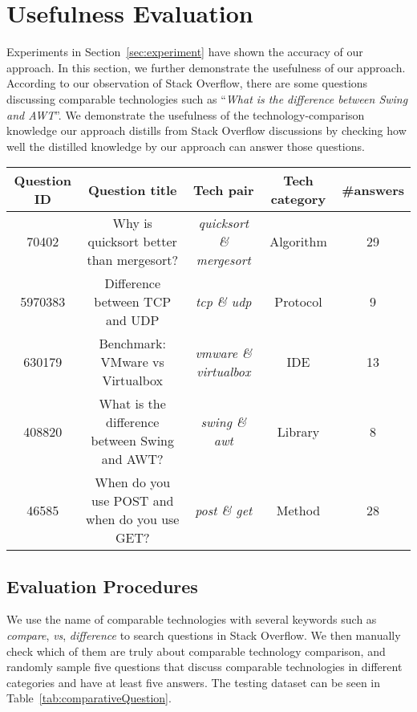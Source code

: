 \section{Usefulness Evaluation}
\label{sec:usefulness}
Experiments in Section~\ref{sec:experiment} have shown the accuracy of our approach.
In this section, we further demonstrate the usefulness of our approach.
According to our observation of Stack Overflow, there are some questions discussing comparable technologies such as ``\textit{What is the difference between Swing and AWT}''.
We demonstrate the usefulness of the technology-comparison knowledge our approach distills from Stack Overflow discussions by checking how well the distilled knowledge by our approach can answer those questions.

\begin{table*}
	\centering
	\caption{Comparative questions}
	\vspace{-3mm}
	\begin{tabular}{c|c|c|c|c}
	\hline
	\textbf{Question ID} & \textbf{Question title} & \textbf{Tech pair} & \textbf{Tech category} & \textbf{\#answers} \\ \hline
	70402 & Why is quicksort better than mergesort? & \textit{quicksort \& mergesort} & Algorithm & 29 \\
	5970383 & Difference between TCP and UDP & \textit{tcp \& udp} & Protocol & 9 \\
	630179 & Benchmark: VMware vs Virtualbox & \textit{vmware \& virtualbox} & IDE & 13 \\
	408820 & What is the difference between Swing and AWT? & \textit{swing \& awt} & Library & 8 \\
	46585 & When do you use POST and when do you use GET? & \textit{post \& get} & Method & 28 \\
	\hline
	\end{tabular}
	\vspace{-1mm}
	\label{tab:comparativeQuestion}
\end{table*}

\subsection{Evaluation Procedures}
We use the name of comparable technologies with several keywords such as \textit{compare}, \textit{vs}, \textit{difference} to search questions in Stack Overflow.
We then manually check which of them are truly about comparable technology comparison, and randomly sample five questions that discuss comparable technologies in different categories and have at least five answers.
The testing dataset can be seen in Table~\ref{tab:comparativeQuestion}.



